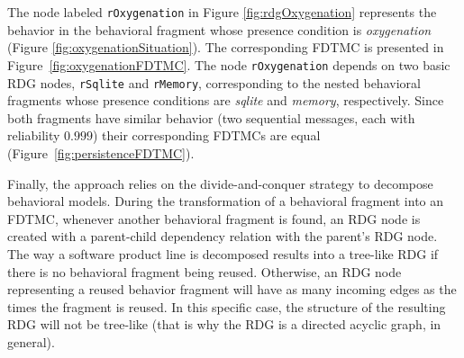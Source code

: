 The node labeled \texttt{rOxygenation} in Figure \ref{fig:rdgOxygenation}
represents the behavior in the behavioral fragment whose presence condition is
\textit{oxygenation} (Figure \ref{fig:oxygenationSituation}).  The corresponding
FDTMC is presented in Figure~\ref{fig:oxygenationFDTMC}.
%
The node \texttt{rOxygenation} depends on two basic RDG nodes, \texttt{rSqlite}
and \texttt{rMemory}, corresponding to the nested behavioral fragments whose
presence conditions are \textit{sqlite} and \textit{memory}, respectively.
Since both fragments have similar behavior (two sequential messages, each with
reliability $0.999$) their corresponding FDTMCs are equal
(Figure~\ref{fig:persistenceFDTMC}).


Finally, the approach relies on the divide-and-conquer strategy to decompose
behavioral models. During the transformation of a behavioral fragment into an
FDTMC, whenever another behavioral fragment is found, an RDG node is created
with a parent-child dependency relation with the parent's RDG node.  The way a
software product line is decomposed results into a tree-like RDG if there is no
behavioral fragment being reused. Otherwise, an  RDG node representing a reused
behavior fragment will have as many incoming edges as the times the fragment is
reused. In this specific case, the structure of the resulting RDG will not be
tree-like (that is why the RDG is a directed acyclic graph, in general). 



